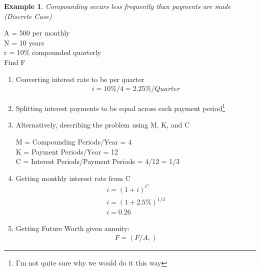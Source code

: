 \documentclass{report} %
\newtheorem{exmp}{Example}
\begin{document}
\begin{exmp}
    Compounding occurs less frequently than payments are made (Discrete Case)
\end{exmp}
\begin{center}
    A = 500 per monthly \\
    N = 10 years \\ 
    r = 10\% compounded quarterly \\
    Find F
\end{center}
\begin{enumerate}
    \item Converting interest rate to be per quarter
    \begin{equation*}
        \begin{aligned}
            i = 10\%/4 = 2.25\%/Quarter
        \end{aligned}
    \end{equation*}
    \item Splitting interest payments to be equal across each payment period\footnote{I'm not quite sure why we would do it this way}
    \item Alternatively, describing the problem using M, K, and C
    \begin{center}
        M = Compounding Periods/Year = 4 \\
        K = Payment Periods/Year = 12 \\
        C = Interest Periods/Payment Periods = 4/12 = 1/3 \\
    \end{center}
    \item Getting monthly interest rate from C
    \begin{equation*}
        \begin{aligned}
            i = (1+i)^C \\
            i = (1+2.5\%)^{1/3} \\
            i = 0.26
        \end{aligned}
    \end{equation*}
    \item Getting Future Worth given annuity: \\
    \begin{equation*}
        \begin{aligned}
            F = (F/A, )
        \end{aligned}
    \end{equation*}
\end{enumerate}
\end{document}
